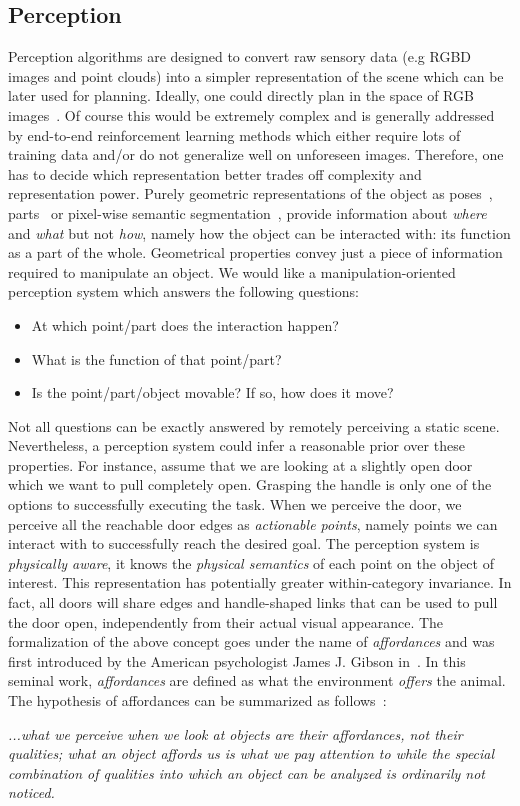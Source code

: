 \subsection{Perception}
Perception algorithms are designed to convert raw sensory data (e.g RGBD images and point clouds) into a simpler representation of the scene which can be later used for planning. Ideally, one could directly plan in the space of RGB images~\cite{levine2016end}. Of course this would be extremely complex and is generally addressed by end-to-end reinforcement learning methods which either require lots of training data and/or do not generalize well on unforeseen images. Therefore, one has to decide which representation better trades off complexity and representation power. Purely geometric representations of the object as poses~\cite{xiang2017posecnn}, parts~\cite{li2020category} or pixel-wise semantic segmentation~\cite{jang2017end}, provide information about \emph{where} and \emph{what} but not \emph{how}, namely how the object can be interacted with: its function as a part of the whole. Geometrical properties convey just a piece of information required to manipulate an object. We would like a manipulation-oriented perception system which answers the following questions:
\begin{itemize}
\item At which point/part does the interaction happen?
\item What is the function of that point/part?
\item Is the point/part/object movable? If so, how does it move?
\end{itemize}     

Not all questions can be exactly answered by remotely perceiving a static scene. Nevertheless, a perception system could infer a reasonable prior over these properties. For instance, assume that we are looking at a slightly open door which we want to pull completely open. Grasping the handle is only one of the options to successfully executing the task. When we perceive the door, we perceive all the reachable door edges as \emph{actionable points}, namely points we can interact with to successfully reach the desired goal. The perception system is \emph{physically aware}, it knows the \emph{physical semantics} of each point on the object of interest. This representation has potentially greater within-category invariance. In fact, all doors will share edges and handle-shaped links that can be used to pull the door open, independently from their actual visual appearance. The formalization of the above concept goes under the name of \emph{affordances} and was first introduced by the American psychologist James J. Gibson in~\cite{gibson1977theory}. In this seminal work, \emph{affordances} are defined as what the environment \emph{offers} the animal. The hypothesis of affordances can be summarized as follows~\cite{gibson1977theory}:
\begin{displayquote}
\emph{...what we perceive when we look at objects are their affordances, not their qualities; what an object affords us is what we pay attention to while the special combination of qualities into which an object can be analyzed is ordinarily not noticed.} 
\end{displayquote}

